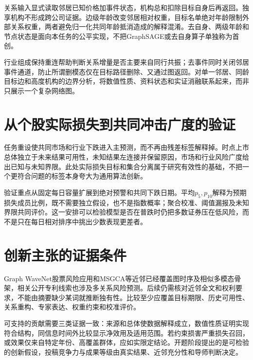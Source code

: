 关系输入显式读取邻居已知价格加事件状态，机构总和扣除目标自身后再返回。独享机构不形成跨公司证据。边级年龄改变邻居相对权重，目标名单绝对年龄限制外部关系权重，两者避免归一化共同年龄抵消造成的解释混淆。去自身、两级年龄和节点状态是面向本任务的公平实现，不把GraphSAGE或去自身算子单独称为首创。

行业组成保持重连帮助判断关系增量是否主要来自同行共振；去事件同时关闭邻居事件通道，防止所谓删模态仅在目标路径删除、又通过图返回。对单一邻居、同龄目标边和高度机构的边界分析，将数值性质、资料状态和实证消融联系起来，而非只展示一个复杂网络图。

\section{从个股实际损失到共同冲击广度的验证}
任务重设使共同市场和行业下跌进入主预测，而不再由残差标签解释掉。时点上市总体独立于未来结果可用性，未知结果左连接并保留原因，市场和行业风险广度给出已知与未知界限。此处实际损失目标和集合分离属于研究有效性的基础，不把一个更符合问题的标签本身夸大为通用算法创新。

验证重点从固定每日容量扩展到绝对预警和共同下跌日期。平均$p_5,p_{10}$解释为预期损失成员比例，既不需要独立假设，也不是指数概率；聚合校准、阈值漏报及未知界限共同评价。这一安排可以检验模型是否在普跌时仍把多数证券压在低风险，而不是只在每日相对排序中挑出少数表现更差者。

\section{创新主张的证据条件}
Graph WaveNet股票风险应用和MSGCA等近邻已经覆盖图时序及相似多模态骨架，相关公开专利线索也涉及多关系风险预测。后续仍需核对近邻全文和权利要求，不能由摘要缺少某词就推断独有性。比较至少应覆盖目标期限、历史可用性、关系重构、专家表达、权重约束和校准评价。

可支持的贡献需要三类证据一致：来源和总体使数据解释成立，数值性质证明实现符合结构，同信息时间外比较显示净效用及适用范围。若约束损害严重损失召回，或效果仅来自特定年份、高覆盖群体，应如实限定结论。开题阶段提出的是可检验的创新假设，投稿竞争力与成果等级由真实结果、近邻充分性和导师判断决定。
